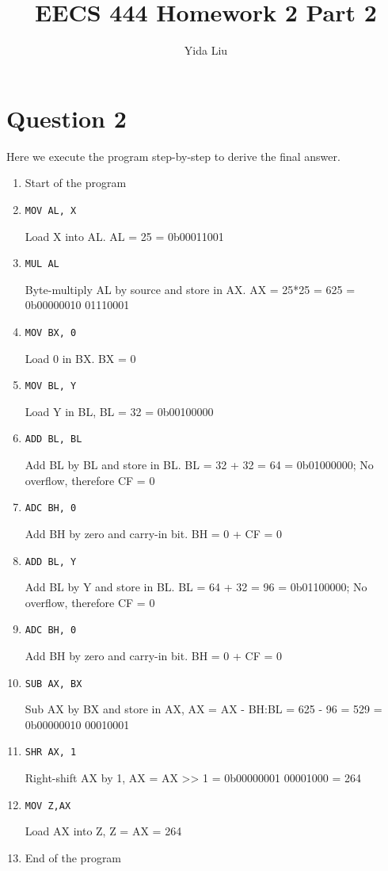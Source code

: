 \documentclass[11pt]{article}
\begin{document}
\author{Yida Liu}
\title{EECS 444 Homework 2 Part 2}
\maketitle

\section{Question 2}
Here we execute the program step-by-step to derive the final answer.

\begin{enumerate}
    \item Start of the program
    \item \lstinline{MOV AL, X} \par
    Load X into AL. AL = 25 = 0b00011001
    \item \lstinline{MUL AL} \par
    Byte-multiply AL by source and store in AX. AX = 25*25 = 625 = 0b00000010 01110001
    \item \lstinline{MOV BX, 0} \par
    Load 0 in BX. BX = 0
    \item \lstinline{MOV BL, Y} \par
    Load Y in BL, BL = 32 = 0b00100000
    \item \lstinline{ADD BL, BL} \par 
    Add BL by BL and store in BL. BL = 32 + 32 = 64 = 0b01000000; No overflow, therefore CF = 0
    \item \lstinline{ADC BH, 0} \par 
    Add BH by zero and carry-in bit. BH = 0 + CF = 0
    \item \lstinline{ADD BL, Y} \par 
    Add BL by Y and store in BL. BL = 64 + 32 = 96 = 0b01100000; No overflow, therefore CF = 0
    \item \lstinline{ADC BH, 0} \par
    Add BH by zero and carry-in bit. BH = 0 + CF = 0
    \item \lstinline{SUB AX, BX}\par
    Sub AX by BX and store in AX, AX = AX - BH:BL = 625 - 96 = 529 = 0b00000010 00010001
    \item \lstinline{SHR AX, 1}\par
    Right-shift AX by 1, AX = AX >> 1 = 0b00000001 00001000 = 264
    \item \lstinline{MOV Z,AX}\par
    Load AX into Z, Z = AX = 264
    \item End of the program\par
\end{enumerate}
\end{document}
